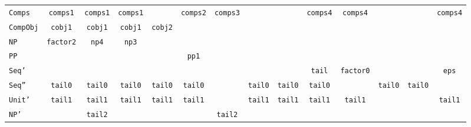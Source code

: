 \begin{longtable}{@{}l*{13}{c}@{}}
\texttt{Comps} & \tiny\texttt{comps1} & \tiny\texttt{comps1} & \tiny\texttt{comps1} &  & \tiny\texttt{comps2} & \tiny\texttt{comps3} &  &  & \tiny\texttt{comps4} & \tiny\texttt{comps4} &  &  & \tiny\texttt{comps4} \\
\texttt{CompObj} & \tiny\texttt{cobj1} & \tiny\texttt{cobj1} & \tiny\texttt{cobj1} & \tiny\texttt{cobj2} &  &  &  &  &  &  &  &  &  \\
\texttt{NP} & \tiny\texttt{factor2} & \tiny\texttt{np4} & \tiny\texttt{np3} &  &  &  &  &  &  &  &  &  &  \\
\texttt{PP} &  &  &  &  & \tiny\texttt{pp1} &  &  &  &  &  &  &  &  \\
\texttt{Seq'} &  &  &  &  &  &  &  &  & \tiny\texttt{tail} & \tiny\texttt{factor0} &  &  & \tiny\texttt{eps} \\
\texttt{Seq''} & \tiny\texttt{tail0} & \tiny\texttt{tail0} & \tiny\texttt{tail0} & \tiny\texttt{tail0} & \tiny\texttt{tail0} &  & \tiny\texttt{tail0} & \tiny\texttt{tail0} & \tiny\texttt{tail0} &  & \tiny\texttt{tail0} & \tiny\texttt{tail0} &  \\
\texttt{Unit'} & \tiny\texttt{tail1} & \tiny\texttt{tail1} & \tiny\texttt{tail1} & \tiny\texttt{tail1} & \tiny\texttt{tail1} &  & \tiny\texttt{tail1} & \tiny\texttt{tail1} & \tiny\texttt{tail1} & \tiny\texttt{tail1} &  &  & \tiny\texttt{tail1} \\
\texttt{NP'} &  & \tiny\texttt{tail2} &  &  &  & \tiny\texttt{tail2} &  &  &  &  &  &  &  \\
\end{longtable}
